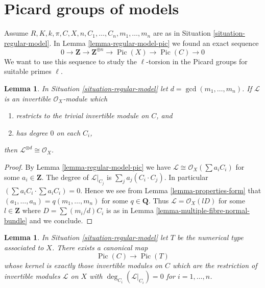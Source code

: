 \documentclass{stacks-project}
\theoremstyle{plain}
\newtheorem{lemma}[subsection]{Lemma}
\theoremstyle{definition}
\theoremstyle{remark}
\numberwithin{equation}{subsection}
\def\Pic{\mathop{\mathrm{Pic}}\nolimits}
\begin{document}
\section{Picard groups of models}
\label{section-picard-groups-models}

\noindent
Assume $R, K, k, \pi, C, X, n, C_1, \ldots, C_n, m_1, \ldots, m_n$
are as in Situation \ref{situation-regular-model}.
In Lemma \ref{lemma-regular-model-pic} we found an exact sequence
$$
0 \to \mathbf{Z} \to \mathbf{Z}^{\oplus n} \to
\Pic(X) \to \Pic(C) \to 0
$$
We want to use this sequence to study the $\ell$-torsion in the
Picard groups for suitable primes $\ell$.

\begin{lemma}
\label{lemma-characterize-trivial}
In Situation \ref{situation-regular-model} let $d = \gcd(m_1, \ldots, m_n)$.
If $\mathcal{L}$ is an invertible $\mathcal{O}_X$-module which
\begin{enumerate}
\item restricts to the trivial invertible module on $C$, and
\item has degree $0$ on each $C_i$,
\end{enumerate}
then $\mathcal{L}^{\otimes d} \cong \mathcal{O}_X$.
\end{lemma}

\begin{proof}
By Lemma \ref{lemma-regular-model-pic} we have
$\mathcal{L} \cong \mathcal{O}_X(\sum a_i C_i)$ for some
$a_i \in \mathbf{Z}$. The degree of $\mathcal{L}|_{C_j}$
is $\sum_j a_j(C_i \cdot C_j)$. In particular
$(\sum a_i C_i \cdot \sum a_i C_i) = 0$.
Hence we see from Lemma \ref{lemma-properties-form}
that $(a_1, \ldots, a_n) = q(m_1, \ldots, m_n)$ for some
$q \in \mathbf{Q}$. Thus $\mathcal{L} = \mathcal{O}_X(lD)$
for some $l \in \mathbf{Z}$ where $D = \sum (m_i/d) C_i$ is as in
Lemma \ref{lemma-multiple-fibre-normal-bundle}
and we conclude.
\end{proof}

\begin{lemma}
\label{lemma-canonical-map-of-pic}
In Situation \ref{situation-regular-model}
let $T$ be the numerical type associated to $X$.
There exists a canonical map
$$
\Pic(C) \to \Pic(T)
$$
whose kernel is exactly those invertible modules on $C$
which are the restriction of invertible modules $\mathcal{L}$
on $X$ with $\deg_{C_i}(\mathcal{L}|_{C_i}) = 0$ for
$i = 1, \ldots, n$.
\end{lemma}
\end{document}
